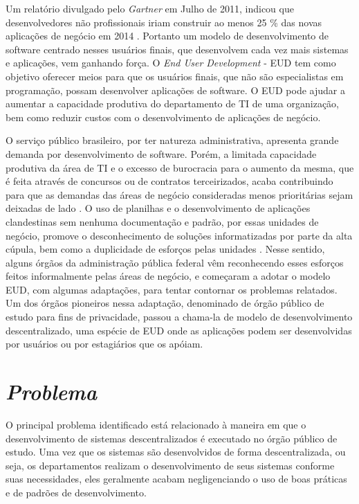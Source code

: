 Um relatório divulgado pelo \textit{Gartner} em Julho de 2011, indicou que desenvolvedores não profissionais iriam construir ao menos 25 \% das novas aplicações de negócio em 2014 \cite{paterno2013}. Portanto um modelo de desenvolvimento de software centrado nesses usuários finais, que desenvolvem cada vez mais sistemas e aplicações, vem ganhando força. O \textit{End User Development} - EUD tem como objetivo oferecer meios para que os usuários finais, que não são especialistas em programação, possam desenvolver aplicações de software. O EUD pode ajudar a aumentar a capacidade produtiva do departamento de TI de uma organização, bem como reduzir custos com o desenvolvimento de aplicações de negócio.

O serviço público brasileiro, por ter natureza administrativa, apresenta grande demanda por desenvolvimento de software. Porém, a limitada capacidade produtiva da área de TI e o excesso de burocracia para o aumento da mesma, que é feita através de concursos ou de contratos terceirizados, acaba contribuindo para que as demandas das áreas de negócio consideradas menos prioritárias sejam deixadas de lado \cite{artigoTcuGovTI}. O uso de planilhas e o desenvolvimento de aplicações clandestinas sem nenhuma documentação e padrão, por essas unidades de negócio, promove o desconhecimento de soluções informatizadas por parte da alta cúpula, bem como a duplicidade de esforços pelas unidades \cite{slideTCU}. Nesse sentido, alguns órgãos da administração pública federal vêm reconhecendo esses esforços feitos informalmente pelas áreas de negócio, e começaram a adotar o modelo EUD, com algumas adaptações, para tentar contornar os problemas relatados. Um dos órgãos pioneiros nessa adaptação, denominado de órgão público de estudo para fins de privacidade, passou a chama-la de modelo de desenvolvimento descentralizado, uma espécie de EUD onde as aplicações podem ser desenvolvidas por usuários ou por estagiários que os apóiam.

\section{\textit{Problema}}

O principal problema identificado está relacionado à maneira em que o desenvolvimento de sistemas descentralizados é executado no órgão público de estudo. Uma vez que os sistemas são desenvolvidos de forma descentralizada, ou seja, os departamentos realizam o desenvolvimento de seus sistemas conforme suas necessidades, eles geralmente acabam negligenciando o uso de boas práticas e de padrões de desenvolvimento.


